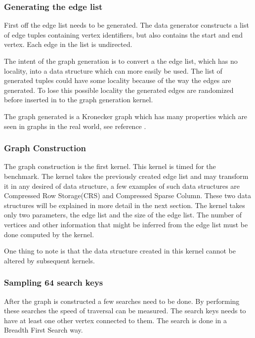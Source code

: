 \subsubsection{Generating the edge list}
First off the edge list needs to be generated. 
The data generator constructs a list of edge tuples containing vertex identifiers, but also contains the start and end vertex. Each edge in the list is undirected.

The intent of the graph generation is to convert a the edge list, which has no locality, into a data structure which can more easily be used. The list of generated tuples could have some locality because of the way the edges are generated. To lose this possible locality the generated edges are randomized before inserted in to the graph generation kernel. 

The graph generated is a Kronecker graph which has many properties which are seen in graphs in the real world, see reference \cite{leskovec2010kronecker}.

\subsubsection{Graph Construction}
The graph construction is the first kernel. This kernel is timed for the benchmark. The kernel takes the previously created edge list and may transform it in any desired of data structure, a few examples of such data structures are Compressed Row Storage(CRS) and Compressed Sparse Column. These two data structures will be explained in more detail in the next section. The kernel takes only two parameters, the edge list and the size of the edge list. The number of vertices and other information that might be inferred from the edge list must be done computed by the kernel. 

One thing to note is that the data structure created in this kernel cannot be altered by subsequent kernels. 

\subsubsection{Sampling 64 search keys}
After the graph is constructed a few searches need to be done. By performing these searches the speed of traversal can be measured. The search keys needs to have at least one other vertex connected to them. The search is done in a Breadth First Search way.

